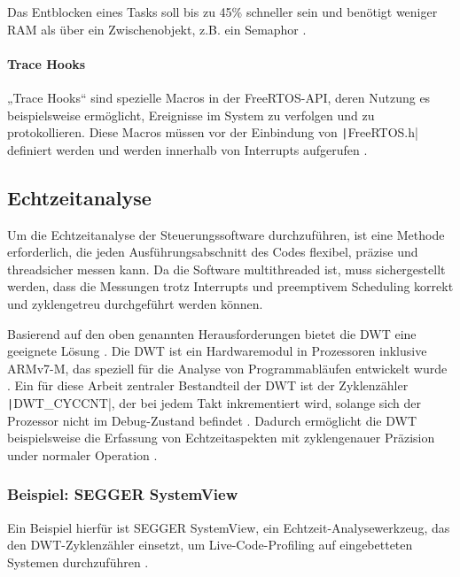 Das Entblocken eines Tasks soll bis zu 45\% schneller sein und benötigt weniger
RAM als über ein Zwischenobjekt, z.B. ein Semaphor
\cite{freertos_task_notifications_usage}.

\paragraph{Trace Hooks}

„Trace Hooks“ sind spezielle Macros in der FreeRTOS-API, deren Nutzung es
beispielsweise ermöglicht, Ereignisse im System zu verfolgen und zu
protokollieren. Diese Macros müssen vor der Einbindung von
\texttt|FreeRTOS.h| definiert werden und werden innerhalb von
Interrupts aufgerufen \cite{freertos_rtos_trace_hooks}.

\subsection{Echtzeitanalyse}

Um die Echtzeitanalyse der Steuerungssoftware durchzuführen, ist eine Methode
erforderlich, die jeden Ausführungsabschnitt des Codes flexibel, präzise und
threadsicher messen kann. Da die Software multithreaded ist, muss sichergestellt
werden, dass die Messungen trotz Interrupts und preemptivem Scheduling korrekt
und zyklengetreu durchgeführt werden können.

Basierend auf den oben genannten Herausforderungen bietet die \ac{DWT} eine
geeignete Lösung \cite{ARM_KA001499}. Die DWT ist ein Hardwaremodul in
Prozessoren inklusive ARMv7-M, das speziell für die Analyse von Programmabläufen
entwickelt wurde \cite{ARMv7_ref_man_dwt_profiling}. Ein für diese Arbeit
zentraler Bestandteil der DWT ist der Zyklenzähler \texttt|DWT_CYCCNT|,
der bei jedem Takt inkrementiert wird, solange sich der Prozessor nicht im
Debug-Zustand befindet \cite{ARMv7_ref_man_dwt_cycle}. Dadurch ermöglicht die
DWT beispielsweise die Erfassung von Echtzeitaspekten mit zyklengenauer
Präzision under normaler Operation \cite{ARMv7_ref_man_dwt}.

\subsubsection{Beispiel: SEGGER SystemView}

Ein Beispiel hierfür ist SEGGER SystemView, ein Echtzeit-Analysewerkzeug, das
den DWT-Zyklenzähler einsetzt, um Live-Code-Profiling auf eingebetteten Systemen
durchzuführen \cite{SEGGER_SystemView}.

